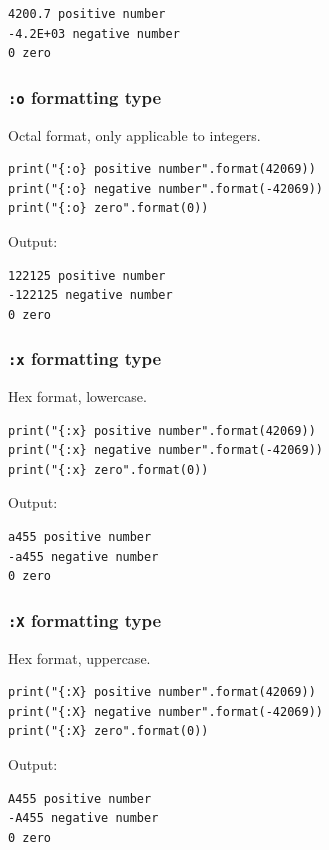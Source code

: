 \documentclass[11pt]{article}
\begin{document}
\begin{verbatim}
4200.7 positive number
-4.2E+03 negative number
0 zero
\end{verbatim}

\subsubsection{\texttt{:o} formatting type}
\label{sec:org4eb61e2}
Octal format, only applicable to integers.

\begin{verbatim}
print("{:o} positive number".format(42069))
print("{:o} negative number".format(-42069))
print("{:o} zero".format(0))
\end{verbatim}

 \noindent Output:

\begin{verbatim}
122125 positive number
-122125 negative number
0 zero
\end{verbatim}

\subsubsection{\texttt{:x} formatting type}
\label{sec:org8f7d31b}
Hex format, lowercase.

\begin{verbatim}
print("{:x} positive number".format(42069))
print("{:x} negative number".format(-42069))
print("{:x} zero".format(0))
\end{verbatim}

 \noindent Output:

\begin{verbatim}
a455 positive number
-a455 negative number
0 zero
\end{verbatim}

\subsubsection{\texttt{:X} formatting type}
\label{sec:org0b94601}
Hex format, uppercase.

\begin{verbatim}
print("{:X} positive number".format(42069))
print("{:X} negative number".format(-42069))
print("{:X} zero".format(0))
\end{verbatim}

 \noindent Output:

\begin{verbatim}
A455 positive number
-A455 negative number
0 zero
\end{verbatim}
\end{document}
